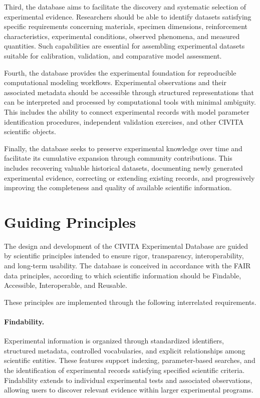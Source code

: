 Third, the database aims to facilitate the discovery and
systematic selection of experimental evidence. Researchers
should be able to identify datasets satisfying specific
requirements concerning materials, specimen dimensions,
reinforcement characteristics, experimental conditions,
observed phenomena, and measured quantities. Such capabilities
are essential for assembling experimental datasets suitable
for calibration, validation, and comparative model assessment.

Fourth, the database provides the experimental foundation
for reproducible computational modeling workflows. Experimental
observations and their associated metadata should be accessible
through structured representations that can be interpreted
and processed by computational tools with minimal ambiguity.
This includes the ability to connect experimental records
with model parameter identification procedures, independent
validation exercises, and other CIVITA scientific objects.

Finally, the database seeks to preserve experimental knowledge
over time and facilitate its cumulative expansion through
community contributions. This includes recovering valuable
historical datasets, documenting newly generated experimental
evidence, correcting or extending existing records, and
progressively improving the completeness and quality of
available scientific information.


\section{Guiding Principles}

The design and development of the CIVITA Experimental Database
are guided by scientific principles intended to ensure rigor,
transparency, interoperability, and long-term usability.
The database is conceived in accordance with the FAIR data
principles, according to which scientific information should
be Findable, Accessible, Interoperable, and Reusable.

These principles are implemented through the following
interrelated requirements.

\paragraph{Findability.}

Experimental information is organized through standardized
identifiers, structured metadata, controlled vocabularies,
and explicit relationships among scientific entities.
These features support indexing, parameter-based searches,
and the identification of experimental records satisfying
specified scientific criteria. Findability extends to
individual experimental tests and associated observations,
allowing users to discover relevant evidence within larger
experimental programs.

